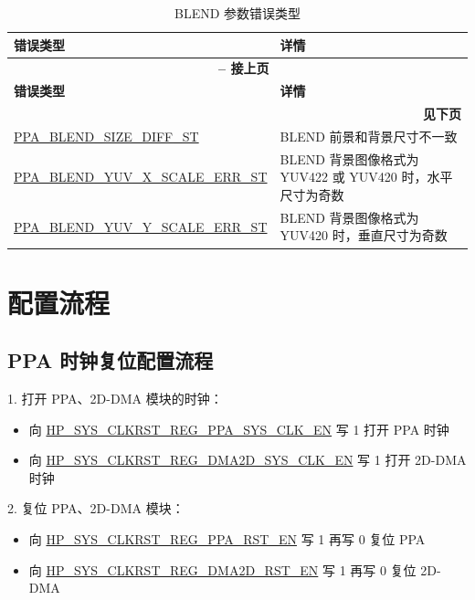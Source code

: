 \documentclass[main\_\_CN.tex]{subfiles}
\begin{document}
\begin{longtable}[c]{ |p{6cm}|p{10cm}| }
    \caption{BLEND 参数错误类型}
    \label{tab:blend_param_err}\\\hline

    \rowcolor{lightgray}
    \textbf{错误类型} & \textbf{详情} \\\hline
    \endfirsthead


    \multicolumn{2}{c}{\bfseries \tablename\ \thetable{} -- 接上页}\\\hline
    \rowcolor{lightgray}
    \textbf{错误类型} & \textbf{详情}  \\\hline
    \endhead

    \multicolumn{2}{r}{\textbf{见下页}} \\
    \endfoot

    \endlastfoot

        \hyperref[fielddesc:PPABLENDSIZEDIFFST]{PPA\_BLEND\_SIZE\_DIFF\_ST} & BLEND 前景和背景尺寸不一致 \\\hline
        \hyperref[fielddesc:PPABLENDYUVXSCALEERRST]{PPA\_BLEND\_YUV\_X\_SCALE\_ERR\_ST} & BLEND 背景图像格式为 YUV422 或 YUV420 时，水平尺寸为奇数 \\\hline
        \hyperref[fielddesc:PPABLENDYUVYSCALEERRST]{PPA\_BLEND\_YUV\_Y\_SCALE\_ERR\_ST} & BLEND 背景图像格式为 YUV420 时，垂直尺寸为奇数 \\\hline

\end{longtable}




\section{配置流程}
\label{sec:ppa-prog-procedures}

\subsection{PPA 时钟复位配置流程}
\label{sec:ppa_clk_rst}
1. 打开 PPA、2D-DMA 模块的时钟：
\begin{itemize}
    \item 向 \hyperref[fielddesc:HPSYSCLKRSTREGPPASYSCLKEN]{HP\_SYS\_CLKRST\_REG\_PPA\_SYS\_CLK\_EN} 写 1 打开 PPA 时钟
    \item 向 \hyperref[fielddesc:HPSYSCLKRSTREGDMA2DSYSCLKEN]{HP\_SYS\_CLKRST\_REG\_DMA2D\_SYS\_CLK\_EN} 写 1 打开 2D-DMA 时钟
\end{itemize}
2. 复位 PPA、2D-DMA 模块：
\begin{itemize}
    \item 向 \hyperref[fielddesc:HPSYSCLKRSTREGPPARSTEN]{HP\_SYS\_CLKRST\_REG\_PPA\_RST\_EN} 写 1 再写 0 复位 PPA
    \item 向 \hyperref[fielddesc:HPSYSCLKRSTREGDMA2DRSTEN]{HP\_SYS\_CLKRST\_REG\_DMA2D\_RST\_EN} 写 1 再写 0 复位 2D-DMA
\end{itemize}
\end{document}
